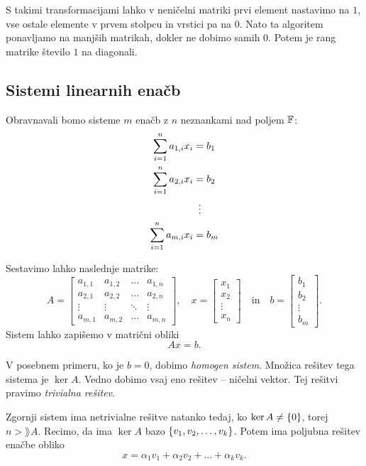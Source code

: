 \documentclass[12pt, a4paper]{article}
\begin{document}
S takimi transformacijami lahko v neničelni matriki prvi element nastavimo na $1$, vse ostale elemente v prvem stolpcu in vrstici pa na $0$. Nato ta algoritem ponavljamo na manjših matrikah, dokler ne dobimo samih $0$. Potem je rang matrike število $1$ na diagonali.

\subsection{Sistemi linearnih enačb}

Obravnavali bomo sisteme $m$ enačb z $n$ neznankami nad poljem $\mathbb{F}$:
\begin{align*}
\sum_{i=1}^n a_{1,i}x_i&=b_1
\\
\sum_{i=1}^n a_{2,i}x_i&=b_2
\\
&\vdotswithin{=}
\\
\sum_{i=1}^n a_{m,i}x_i&=b_m
\end{align*}

Sestavimo lahko naslednje matrike:
\[
A=\begin{bmatrix}
a_{1,1} & a_{1,2} & \dots & a_{1,n} \\ 
a_{2,1} & a_{2,2} & \dots & a_{2,n} \\ 
\vdots & \vdots & \ddots & \vdots \\ 
a_{m,1} & a_{m,2} & \dots & a_{m,n}
\end{bmatrix},
\quad
x=\begin{bmatrix}
x_1 \\
x_2 \\
\vdots \\
x_n
\end{bmatrix}
\quad\text{in}\quad
b=\begin{bmatrix}
b_1 \\
b_2 \\
\vdots \\
b_m
\end{bmatrix}.
\]
Sistem lahko zapišemo v matrični obliki
\[
Ax=b.
\]

V posebnem primeru, ko je $b=0$, dobimo \emph{homogen sistem}. Množica rešitev tega sistema je $\ker A$. Vedno dobimo vsaj eno rešitev -- ničelni vektor. Tej rešitvi pravimo \emph{trivialna rešitev}.

Zgornji sistem ima netrivialne rešitve natanko tedaj, ko $\ker A\ne\left\{0\right\}$, torej $n>\rang A$. Recimo, da ima $\ker A$ bazo $\left\{v_1,v_2,\dots,v_k\right\}$. Potem ima poljubna rešitev enačbe obliko
\[
x=\alpha_1v_1+\alpha_2v_2+\dots+\alpha_kv_k.
\]
\end{document}
